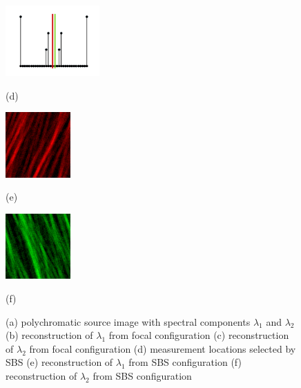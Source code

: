 \documentclass{article}
\begin{document}
\begin{figure}[t]
\begin{minipage}[b]{0.32\linewidth}
  \centering
  \centerline{\includegraphics[width=3.6cm]{csbs_copies}}
  \centerline{(d)}
\end{minipage}
\begin{minipage}[b]{0.32\linewidth}
  \centering
  \centerline{\includegraphics[width=2.5cm]{recon_csbs1}}
  \centerline{(e)}
\end{minipage}
\begin{minipage}[b]{0.32\linewidth}
  \centering
  \centerline{\includegraphics[width=2.5cm]{recon_csbs2}}
  \centerline{(f)}
\end{minipage}
\caption{(a) polychromatic source image with spectral components $\lambda_1$ and
  $\lambda_2$ (b) reconstruction of $\lambda_1$ from focal configuration (c)
  reconstruction of $\lambda_2$ from focal configuration (d) measurement
  locations selected by SBS (e) reconstruction of
  $\lambda_1$ from SBS configuration (f) reconstruction of $\lambda_2$ from
  SBS configuration}
\label{fig:results}
\end{figure}

\end{document}
